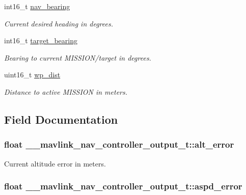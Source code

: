\begin{DoxyCompactItemize}
int16\+\_\+t \hyperlink{struct____mavlink__nav__controller__output__t_ae18c3d9716a9ec77450d9acf03ea1f64}{nav\+\_\+bearing}
\begin{DoxyCompactList}\small\item\em Current desired heading in degrees. \end{DoxyCompactList}\item 
int16\+\_\+t \hyperlink{struct____mavlink__nav__controller__output__t_a4601945c2201a6dcaca7acc5154e087e}{target\+\_\+bearing}
\begin{DoxyCompactList}\small\item\em Bearing to current M\+I\+S\+S\+I\+O\+N/target in degrees. \end{DoxyCompactList}\item 
uint16\+\_\+t \hyperlink{struct____mavlink__nav__controller__output__t_aa7d7186c64fdd4cf8a0ace5bd2a071f1}{wp\+\_\+dist}
\begin{DoxyCompactList}\small\item\em Distance to active M\+I\+S\+S\+I\+O\+N in meters. \end{DoxyCompactList}\end{DoxyCompactItemize}


\subsection{Field Documentation}
\hypertarget{struct____mavlink__nav__controller__output__t_a40a6a20a742864361b047967ce7eb9df}{
\subsubsection[{alt\+\_\+error}]{\setlength{\rightskip}{0pt plus 5cm}float \+\_\+\+\_\+mavlink\+\_\+nav\+\_\+controller\+\_\+output\+\_\+t\+::alt\+\_\+error}}\label{struct____mavlink__nav__controller__output__t_a40a6a20a742864361b047967ce7eb9df}


Current altitude error in meters. 

\hypertarget{struct____mavlink__nav__controller__output__t_af9d8faadd55533885c61717a7a7ac407}{
\subsubsection[{aspd\+\_\+error}]{\setlength{\rightskip}{0pt plus 5cm}float \+\_\+\+\_\+mavlink\+\_\+nav\+\_\+controller\+\_\+output\+\_\+t\+::aspd\+\_\+error}}\label{struct____mavlink__nav__controller__output__t_af9d8faadd55533885c61717a7a7ac407}


